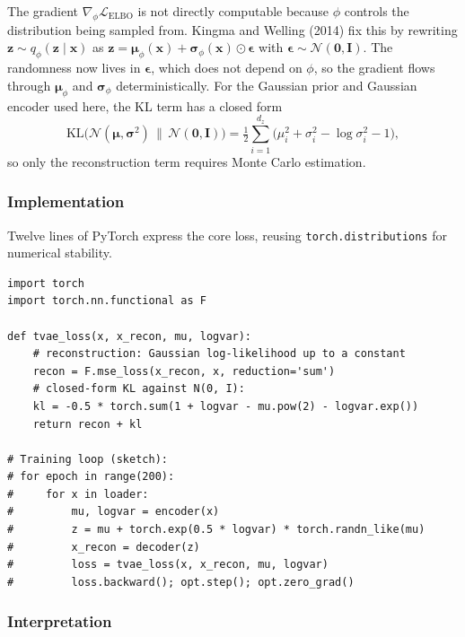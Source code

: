 \documentclass{article}
\begin{document}
The gradient $\nabla_\phi \mathcal{L}_\text{ELBO}$ is not directly computable because $\phi$ controls the distribution being sampled from. Kingma and Welling (2014) fix this by rewriting $\mathbf{z} \sim q_\phi(\mathbf{z} \mid \mathbf{x})$ as $\mathbf{z} = \boldsymbol\mu_\phi(\mathbf{x}) + \boldsymbol\sigma_\phi(\mathbf{x}) \odot \boldsymbol\epsilon$ with $\boldsymbol\epsilon \sim \mathcal{N}(\mathbf{0}, \mathbf{I})$. The randomness now lives in $\boldsymbol\epsilon$, which does not depend on $\phi$, so the gradient flows through $\boldsymbol\mu_\phi$ and $\boldsymbol\sigma_\phi$ deterministically. For the Gaussian prior and Gaussian encoder used here, the KL term has a closed form
\begin{equation}
\mathrm{KL}\!\bigl(\mathcal{N}(\boldsymbol\mu, \boldsymbol\sigma^2) \,\|\, \mathcal{N}(\mathbf{0}, \mathbf{I})\bigr) = \tfrac{1}{2} \sum_{i=1}^{d_z} \bigl(\mu_i^2 + \sigma_i^2 - \log \sigma_i^2 - 1\bigr),
\label{eq:kl-gaussian}
\end{equation}
so only the reconstruction term requires Monte Carlo estimation.

\subsubsection*{Implementation}

Twelve lines of PyTorch express the core loss, reusing \texttt{torch.distributions} for numerical stability.

\begin{lstlisting}[caption={Per-batch TVAE loss, with closed-form Gaussian KL.}]
import torch
import torch.nn.functional as F

def tvae_loss(x, x_recon, mu, logvar):
    # reconstruction: Gaussian log-likelihood up to a constant
    recon = F.mse_loss(x_recon, x, reduction='sum')
    # closed-form KL against N(0, I):
    kl = -0.5 * torch.sum(1 + logvar - mu.pow(2) - logvar.exp())
    return recon + kl

# Training loop (sketch):
# for epoch in range(200):
#     for x in loader:
#         mu, logvar = encoder(x)
#         z = mu + torch.exp(0.5 * logvar) * torch.randn_like(mu)
#         x_recon = decoder(z)
#         loss = tvae_loss(x, x_recon, mu, logvar)
#         loss.backward(); opt.step(); opt.zero_grad()
\end{lstlisting}

\subsubsection*{Interpretation}
\end{document}
